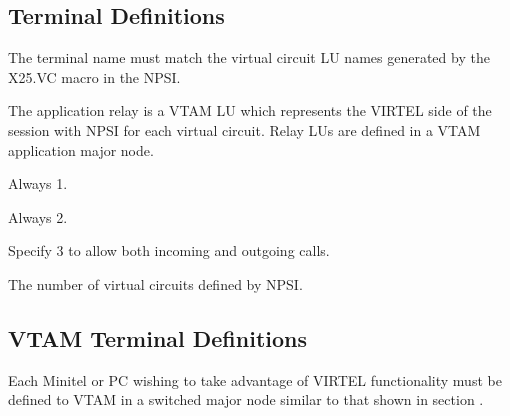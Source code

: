 \documentclass[letterpaper,10pt,english]{sphinxmanual}
\begin{document}
\sphinxAtStartPar
{}

\ignorespaces 

\subsection{Terminal Definitions}
\label{\detokenize{connectivity_guide:index-70}}\label{\detokenize{connectivity_guide:id32}}\begin{description}
\sphinxAtStartPar
The terminal name must match the virtual circuit LU names generated
by the X25.VC macro in the NPSI.

\sphinxAtStartPar
The application relay is a VTAM LU which represents the VIRTEL side
of the session with NPSI for each virtual circuit. Relay LUs are
defined in a VTAM application major node.

\sphinxAtStartPar
Always 1.

\sphinxAtStartPar
Always 2.

\sphinxAtStartPar
Specify 3 to allow both incoming and outgoing calls.

\sphinxAtStartPar
The number of virtual circuits defined by NPSI.

\end{description}

\ignorespaces 

\subsection{VTAM Terminal Definitions}
\label{\detokenize{connectivity_guide:index-71}}\label{\detokenize{connectivity_guide:id33}}
\sphinxAtStartPar
Each Minitel or PC wishing to take advantage of VIRTEL functionality must be defined to VTAM in a switched major node similar to that shown in section {\hyperref[\detokenize{connectivity_guide:v462cn-x25gateline}]{}}.
\end{document}
